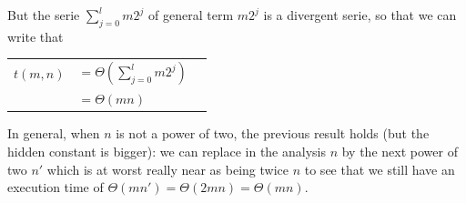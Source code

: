 But the serie $\sum_{j=0}^{l} {m 2^j}$ of general term $m 2^j$ is a divergent serie, so that we can write that

\begin{tabular}{lll}
$t(m,n)$  & $ = \Theta( \sum_{j=0}^{l} { m 2^j } )$
\\ & $ = \Theta(mn)$
\end{tabular}

In general, when $n$ is not a power of two, the previous result holds (but the hidden constant is bigger): we can replace in the analysis $n$ by the next power of two $n'$ which is at worst really near as being twice $n$ to see that we still have an execution time of $\Theta(mn')=\Theta(2mn)=\Theta(mn)$.